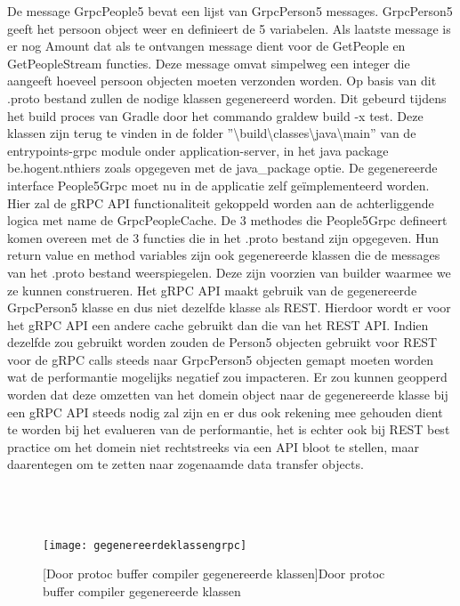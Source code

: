 De message GrpcPeople5 bevat een lijst van GrpcPerson5 messages. GrpcPerson5 geeft het persoon object weer en definieert de 5 variabelen. Als laatste message is er nog
Amount dat als te ontvangen message dient voor de GetPeople en GetPeopleStream functies. Deze message omvat simpelweg een integer die aangeeft hoeveel persoon objecten moeten
verzonden worden.\newline
Op basis van dit .proto bestand zullen de nodige klassen gegenereerd worden. Dit gebeurd tijdens het build proces van Gradle door het commando graldew build -x test.
Deze klassen zijn terug te vinden in de folder ''\textbackslash{}build\textbackslash{}classes\textbackslash{}java\textbackslash{}main'' van de entrypoints-grpc module onder application-server,
in het java package be.hogent.nthiers zoals opgegeven met de java\_package optie. De gegenereerde interface People5Grpc moet nu in de applicatie zelf geïmplementeerd worden.
Hier zal de gRPC API functionaliteit gekoppeld worden aan de achterliggende logica met name de GrpcPeopleCache. De 3 methodes die People5Grpc defineert komen overeen met de 3 functies die
in het .proto bestand zijn opgegeven. Hun return value en method variables zijn ook gegenereerde klassen die de messages van het .proto bestand weerspiegelen.
Deze zijn voorzien van builder waarmee we ze kunnen construeren.\newline
Het gRPC API maakt gebruik van de gegenereerde GrpcPerson5 klasse en dus niet dezelfde klasse als REST. Hierdoor wordt er voor het gRPC API een andere cache gebruikt dan
die van het REST API. Indien dezelfde zou gebruikt worden zouden de Person5 objecten gebruikt voor REST voor de gRPC calls steeds naar GrpcPerson5 objecten gemapt moeten worden
wat de performantie mogelijks negatief zou impacteren. Er zou kunnen geopperd worden dat deze omzetten van het domein object naar de gegenereerde klasse bij een gRPC API steeds nodig
zal zijn en er dus ook rekening mee gehouden dient te worden bij het evalueren van de performantie, het is echter ook bij REST best practice om het domein niet rechtstreeks
via een API bloot te stellen, maar daarentegen om te zetten naar zogenaamde data transfer objects.\newline
~\autocite{quarkusgRPC}\\
~\autocite{DTO}\\
~\autocite{gRPCBestPractices}\\
~\autocite{builderPattern}\\

\begin{figure}[ht]
    \centering
    \texttt{[image: gegenereerdeklassengrpc]}
    \caption{[Door protoc buffer compiler gegenereerde klassen]Door protoc buffer compiler gegenereerde klassen}
\end{figure}


